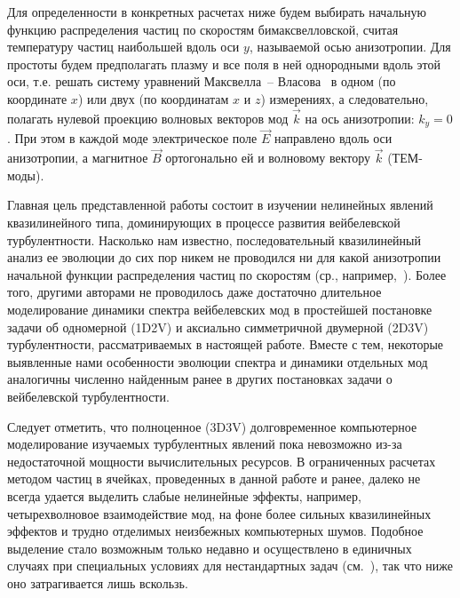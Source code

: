 Для определенности в конкретных расчетах ниже будем выбирать начальную функцию распределения частиц по скоростям бимаксвелловской, считая температуру частиц наибольшей вдоль оси $y$, называемой осью анизотропии. Для простоты будем предполагать плазму и все поля в ней однородными вдоль этой оси, т.е. решать систему уравнений Максвелла~-- Власова~\cite{Baumjohann2012} в одном (по координате $x$) или двух (по координатам $x$ и $z$) измерениях, а следовательно, полагать нулевой проекцию волновых векторов мод $\vec{k}$ на ось анизотропии: $k_y=0$. При этом в каждой моде электрическое поле $\vec{E}$ направлено вдоль оси анизотропии, а магнитное $\vec{B}$ ортогонально ей и волновому вектору $\vec{k}$ (ТЕМ-моды). 

Главная цель представленной работы состоит в изучении нелинейных явлений квазилинейного типа, доминирующих в процессе развития вейбелевской турбулентности. Насколько нам известно, последовательный квазилинейный анализ ее эволюции до сих пор никем не проводился ни для какой анизотропии начальной функции распределения частиц по скоростям (ср., например,~\cite{Ruyer2015,Pokhotelov2011,Davidson1972}). Более того, другими авторами не проводилось даже достаточно длительное моделирование динамики спектра вейбелевских мод в простейшей постановке задачи об одномерной (1D2V) и аксиально симметричной двумерной (2D3V) турбулентности, рассматриваемых в настоящей работе. Вместе с тем, некоторые выявленные нами особенности эволюции спектра и динамики отдельных мод аналогичны численно найденным ранее в других постановках задачи о вейбелевской турбулентности.

Следует отметить, что полноценное (3D3V) долговременное компьютерное моделирование изучаемых турбулентных явлений пока невозможно из-за недостаточной мощности вычислительных ресурсов. В ограниченных расчетах методом частиц в ячейках, проведенных в данной работе и ранее, далеко не всегда удается выделить слабые нелинейные эффекты, например, четырехволновое взаимодействие мод, на фоне более сильных квазилинейных эффектов и трудно отделимых неизбежных компьютерных шумов. Подобное выделение стало возможным только недавно и осуществлено в единичных случаях при специальных условиях для нестандартных задач (см.~\cite{Garasev2017_Radiophys,Garasev2021}), так что ниже оно затрагивается лишь вскользь.

